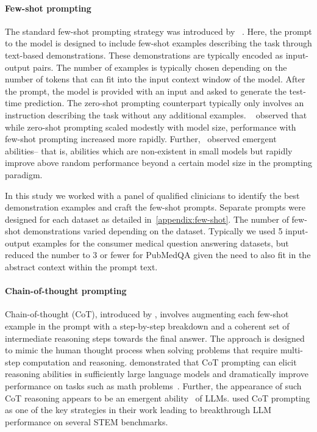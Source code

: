 \documentclass[10pt, letter, onecolumn]{arxiv}
\begin{document}
\begin{refsection}
\paragraph{Few-shot prompting} The standard few-shot prompting strategy was introduced by ~\citet{brown2020language}. Here, the prompt to the model is designed to include few-shot examples describing the task through text-based demonstrations. These demonstrations are typically encoded as input-output pairs. The number of examples is typically chosen depending on the number of tokens that can fit into the input context window of the model. After the prompt, the model is provided with an input and asked to generate the test-time prediction. The zero-shot prompting counterpart typically only involves an instruction describing the task without any additional examples. ~\citet{brown2020language} observed that while zero-shot prompting scaled modestly with model size, performance with few-shot prompting increased more rapidly. Further,~\citet{wei2022emergent} observed emergent abilities– that is, abilities which are non-existent in small models but rapidly improve above random performance beyond a certain model size in the prompting paradigm.

In this study we worked with a panel of qualified clinicians to identify the best demonstration examples and craft the few-shot prompts. Separate prompts were designed for each dataset as detailed in~\cref{appendix:few-shot}. The number of few-shot demonstrations varied depending on the dataset. Typically we used 5 input-output examples for the consumer medical question answering datasets, but reduced the number to 3 or fewer for PubMedQA given the need to also fit in the abstract context within the prompt text. 

\paragraph{Chain-of-thought prompting}\label{cot} Chain-of-thought (CoT), introduced by \citet{wei2022chain}, involves augmenting each few-shot example in the prompt with a step-by-step breakdown and a coherent set of intermediate reasoning steps towards the final answer. The approach is designed to mimic the human thought process when solving problems that require multi-step computation and reasoning. \citet{wei2022chain} demonstrated that CoT prompting can elicit reasoning abilities in sufficiently large language models and dramatically improve performance on tasks such as math problems~\cite{cobbe2021training}. Further, the appearance of such CoT reasoning appears to be an emergent ability~\cite{wei2022emergent} of LLMs. \citet{lewkowycz2022solving} used CoT prompting as one of the key strategies in their work leading to breakthrough LLM performance on several STEM benchmarks. 


\end{refsection}
\end{document}
